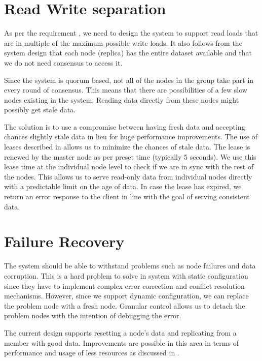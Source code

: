 \section{Read Write separation}

As per the requirement , we need to design the
system to support read loads that are in multiple of the maximum possible write
loads. It also follows from the system design that each node (replica) has the
entire dataset available and that we do not need consensus to access it. 

Since the system is quorum based, not all of the nodes in the group take part
in every round of consensus. This means that there are possibilities of a few 
slow nodes existing in the system. Reading data directly from these nodes might
possibly get stale data.

The solution is to use a compromise between having fresh data and accepting 
chances slightly stale data in lieu for huge performance improvements. The
use of leases described in  allows us to minimize the
chances of stale data. The lease is renewed by the master node as per preset 
time (typically 5 seconds). We use this lease time at the individual node level 
to check if we are in sync with the rest of the nodes. This allows us to serve 
read-only data from individual nodes directly with a predictable limit on the 
age of data. In case the lease has expired, we return an error response to
the client in line with the goal of serving consistent data.

\section{Failure Recovery}

The system should be able to withstand problems such as node failures and data
corruption. This is a hard problem to solve in system with static configuration
since they have to implement complex error correction and conflict resolution
mechanisms. However, since we support dynamic configuration, we can replace
the problem node with a fresh node. Granular control allows us to detach the
problem nodes with the intention of debugging the error.

The current design supports resetting a node's data and replicating from
a member with good data. Improvements are possible in this area in terms of
performance and usage of less resources as discussed in
.







